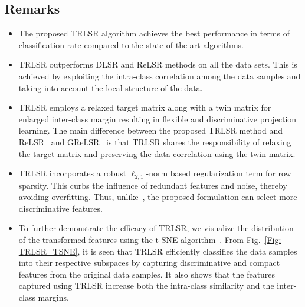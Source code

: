 \subsection{Remarks}
%
\begin{itemize}
%
\item The proposed TRLSR algorithm achieves the best performance in terms of classification rate compared to the state-of-the-art algorithms.
%
\item TRLSR outperforms DLSR and ReLSR methods on all the data sets. This is achieved by exploiting the intra-class correlation among the data samples and taking into account the local structure of the data.
%
\item TRLSR employs a relaxed target matrix along with a twin matrix for enlarged inter-class margin resulting in flexible and discriminative projection learning. The main difference between the proposed TRLSR method and ReLSR~\cite{ReLSR} and GReLSR~\cite{GReLSR} is that TRLSR shares the responsibility of relaxing the target matrix and preserving the data correlation using the twin matrix.
%
\item TRLSR incorporates a robust $\ell_{2,1}$-norm based regularization term for row sparsity. This curbs the influence of redundant features and noise, thereby avoiding overfitting. Thus, unlike~\cite{DLSR, ReLSR, GReLSR}, the proposed formulation can select more discriminative features.
%
\item To further demonstrate the efficacy of TRLSR, we visualize the distribution of the transformed features using the t-SNE algorithm~\cite{TSNE}. From Fig.~\ref{Fig: TRLSR_TSNE}, it is seen that TRLSR efficiently classifies the data samples into their respective subspaces by capturing discriminative and compact features from the original data samples. It also shows that the features captured using TRLSR increase both the intra-class similarity and the inter-class margins.
%
\end{itemize}
%

